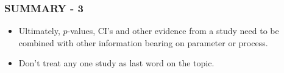 \documentclass[10pt]{beamer}\usepackage[]{graphicx}\usepackage[]{color}
\begin{document}
\begin{frame}
	\frametitle{SUMMARY - 3}
	\begin{itemize}
		\item
		Ultimately, $p$-values, CI's and other evidence from a study need to be combined with other information bearing on  parameter or process. \newline
		\item
		Don't treat any one study as last word on the topic. \newline
	\end{itemize}
\end{frame}
\end{document}
